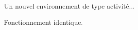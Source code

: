 \begin{nouveau}[titre][\tice]
    Un nouvel environnement de type activité...

    Fonctionnement identique.
\end{nouveau}
